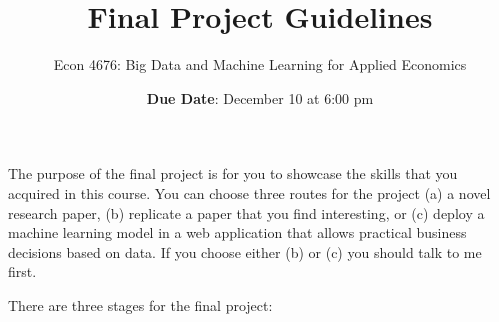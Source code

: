 \documentclass[12pt,onecolumn]{article}
\title{Final Project Guidelines}
\subtitle{Econ 4676: Big Data and Machine Learning for Applied Economics}
\author{{\bf Due Date}: December 10 at 6:00 pm}
\date{}
\begin{document}
\maketitle


The purpose of the final project is for you to showcase the skills that you acquired in this course. You can choose three routes for the project (a) a novel research paper, (b) replicate a paper that you find interesting, or (c) deploy a machine learning model in a web application that allows practical business decisions based on data. If you choose either (b) or (c) you should  talk to me first.

There are three stages for the final project:
\end{document}

